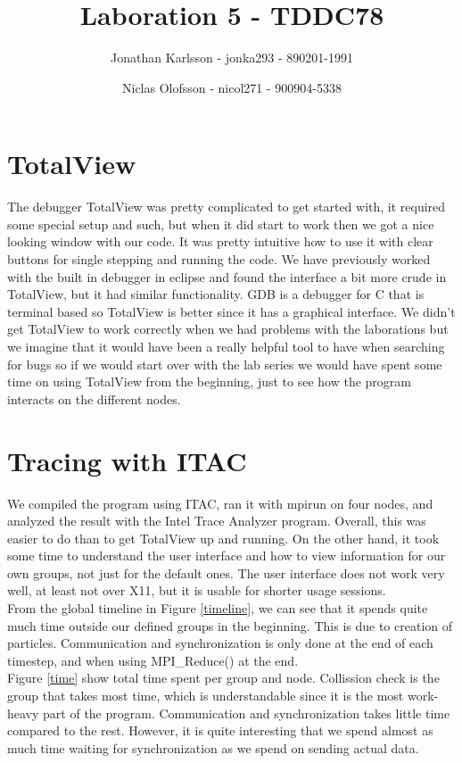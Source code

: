 \documentclass[a4paper]{article}
\author{Jonathan Karlsson - jonka293 - 890201-1991 \and Niclas Olofsson - nicol271 - 900904-5338}
\title{Laboration 5 - TDDC78}
\begin{document}
\maketitle

\section{TotalView}
The debugger TotalView was pretty complicated to get started with, it required some special setup and such, but when it did start to work then we got a nice looking window with our code. It was pretty intuitive how to use it with clear buttons for single stepping and running the code. We have previously worked with the built in debugger in eclipse and found the interface a bit more crude in TotalView, but it had similar functionality. GDB is a debugger for C that is terminal based so TotalView is better since it has a graphical interface. We didn\rq{}t get TotalView to work correctly when we had problems with the laborations but we imagine that it would have been a really helpful tool to have when searching for bugs so if we would start over with the lab series we would have spent some time on using TotalView from the beginning, just to see how the program interacts on the different nodes.

\section{Tracing with ITAC}

We compiled the program using ITAC, ran it with mpirun on four nodes,
and analyzed the result with the Intel Trace Analyzer program. Overall,
this was easier to do than to get TotalView up and running. On the other
hand, it took some time to understand the user interface and how to view
information for our own groups, not just for the default ones. The user
interface does not work very well, at least not over X11, but it is
usable for shorter usage sessions.\\

From the global timeline in Figure \ref{timeline}, we can see that it
spends quite much time outside our defined groups in the beginning. This
is due to creation of particles. Communication and synchronization is
only done at the end of each timestep, and when using MPI\_Reduce() at
the end.\\

Figure \ref{time} show total time spent per group and node. Collission
check is the group that takes most time, which is understandable since
it is the most work-heavy part of the program. Communication and
synchronization takes little time compared to the rest. However, it is
quite interesting that we spend almost as much time waiting for
synchronization as we spend on sending actual data.\\
\end{document}
